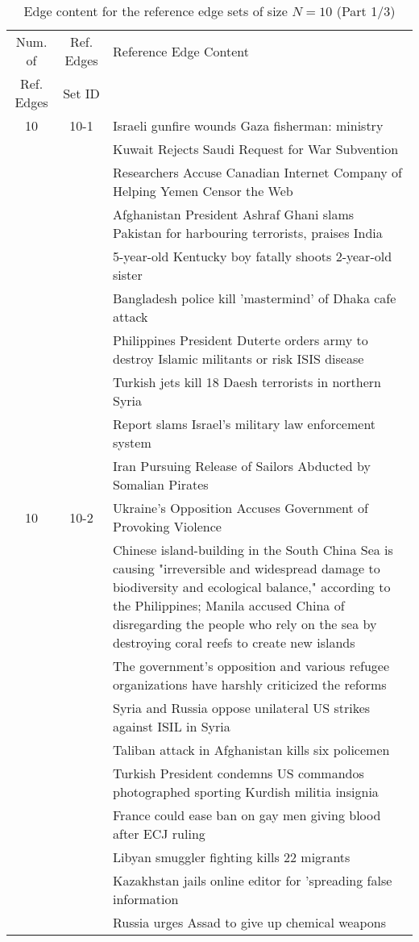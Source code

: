 \begin{table}[H]
\begin{tabular}{cc p{10cm}}
\toprule
\multicolumn{1}{c}{Num. of}			& \multicolumn{1}{c}{Ref. Edges}		& \multicolumn{1}{l}{Reference Edge Content} \\
\multicolumn{1}{c}{Ref. Edges}		& \multicolumn{1}{c}{Set ID}			& \multicolumn{1}{c}{} \\
\midrule
10 & 10-1 & Israeli gunfire wounds Gaza fisherman: ministry \\
 &  & Kuwait Rejects Saudi Request for War Subvention \\
 &  & Researchers Accuse Canadian Internet Company of Helping Yemen Censor the Web \\
 &  & Afghanistan President Ashraf Ghani slams Pakistan for harbouring terrorists, praises India \\
 &  & 5-year-old Kentucky boy fatally shoots 2-year-old sister \\
 &  & Bangladesh police kill 'mastermind' of Dhaka cafe attack \\
 &  & Philippines President Duterte orders army to destroy Islamic militants or risk ISIS disease \\
 &  & Turkish jets kill 18 Daesh terrorists in northern Syria \\
 &  & Report slams Israel's military law enforcement system \\
 &  & Iran Pursuing Release of Sailors Abducted by Somalian Pirates \\
\hline
10 & 10-2 & Ukraine’s Opposition Accuses Government of Provoking Violence \\
 &  & Chinese island-building in the South China Sea is causing "irreversible and widespread damage to biodiversity and ecological balance," according to the Philippines; Manila accused China of disregarding the people who rely on the sea by destroying coral reefs to create new islands \\
 &  & The government's opposition and various refugee organizations have harshly criticized the reforms \\
 &  & Syria and Russia oppose unilateral US strikes against ISIL in Syria \\
 &  & Taliban attack in Afghanistan kills six policemen \\
 &  & Turkish President condemns US commandos photographed sporting Kurdish militia insignia \\
 &  & France could ease ban on gay men giving blood after ECJ ruling \\
 &  & Libyan smuggler fighting kills 22 migrants \\
 &  & Kazakhstan jails online editor for 'spreading false information \\
 &  & Russia urges Assad to give up chemical weapons \\
\bottomrule
\end{tabular}
\caption{Edge content for the reference edge sets of size \(N = 10\) (Part 1/3)}
\label{tab:ref-edge-sets-nref-10-part-1}
\end{table}

